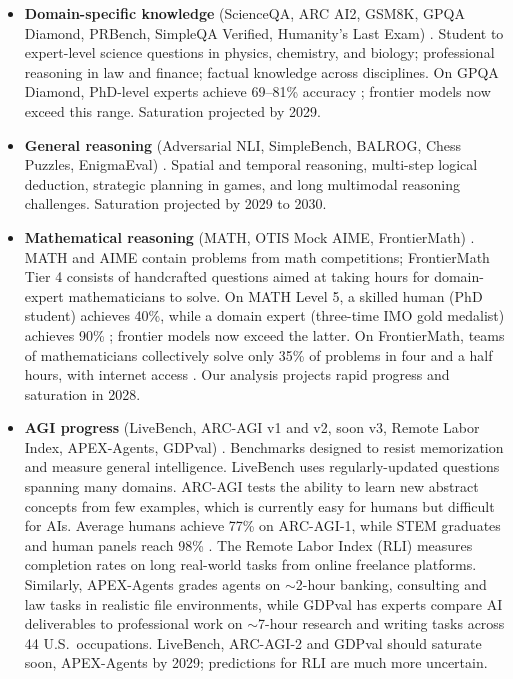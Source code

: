 \documentclass[letterpaper,twocolumn]{article}
\newcommand{\revised}[1]{#1}
\begin{document}
\begin{itemize}
    \item \textbf{Domain-specific knowledge} (ScienceQA, ARC AI2, GSM8K, GPQA Diamond, PRBench, SimpleQA Verified, Humanity's Last Exam) \citep{lu_learn_2022,clark_think_2018,cobbe_training_2021,rein_gpqa_2023,wang_mmlu-pro_2024,akyurek_prbench_2025,haas_simpleqa_2025,phan_humanitys_2025}. Student to expert-level science questions in physics, chemistry, and biology; professional reasoning in law and finance; factual knowledge across disciplines. On GPQA Diamond, PhD-level experts achieve 69--81\% accuracy \citep{rein_gpqa_2023}; frontier models now exceed this range. Saturation projected by 2029.
    \item \textbf{General reasoning} (Adversarial NLI, SimpleBench, BALROG, Chess Puzzles, EnigmaEval) \citep{nie_adversarial_2020, philip_simplebench_2024,paglieri_balrog_2025,epoch_ai_chess_2025,wang_enigmaeval_2025}. Spatial and temporal reasoning, multi-step logical deduction, strategic planning in games, and long multimodal reasoning challenges. Saturation projected by 2029 to 2030.
    \item \textbf{Mathematical reasoning} (MATH, OTIS Mock AIME, FrontierMath) \citep{hendrycks_measuring_2021,epoch_ai_otis_2025,epoch_ai_frontiermath_2025}. MATH and AIME contain problems from math competitions; FrontierMath Tier 4 consists of handcrafted questions aimed at taking hours for domain-expert mathematicians to solve. On MATH Level 5, a skilled human (PhD student) achieves 40\%, while a domain expert (three-time IMO gold medalist) achieves 90\% \citep{hendrycks_measuring_2021}; frontier models now exceed the latter. On FrontierMath, teams of mathematicians collectively solve only 35\% of problems in four and a half hours, with internet access \citep{epoch_ai_frontiermath_2025}. Our analysis projects rapid progress and saturation in 2028.
    \item \textbf{AGI progress} (LiveBench, ARC-AGI v1 and v2, soon v3, Remote Labor Index, \revised{APEX-Agents, GDPval}) \citep{white_livebench_2025,chollet_measure_2019, arc_prize_arc-agi-1_2019,arc_prize_arc-agi-2_2025,arc_prize_arc-agi-3_2025,mazeika_remote_2025,vidgen_apex-agents_2026,patwardhan_gdpval_2025}. Benchmarks designed to resist memorization and measure general intelligence. LiveBench uses regularly-updated questions spanning many domains. ARC-AGI tests the ability to learn new abstract concepts from few examples, which is currently easy for humans but difficult for AIs. Average humans achieve 77\% on ARC-AGI-1, while STEM graduates and human panels reach 98\% \citep{arc_prize_arc-agi-1_2019}. The Remote Labor Index (RLI) measures completion rates on \revised{long} real-world tasks from online freelance platforms. \revised{Similarly, APEX-Agents grades agents on $\sim$2-hour banking, consulting and law tasks in realistic file environments, while GDPval has experts compare AI deliverables to professional work on $\sim$7-hour research and writing tasks across 44 U.S.\ occupations.} LiveBench, ARC-AGI-2 \revised{and GDPval} should saturate soon, APEX-Agents by 2029; predictions for RLI are much more uncertain.
\end{itemize}
\end{document}
